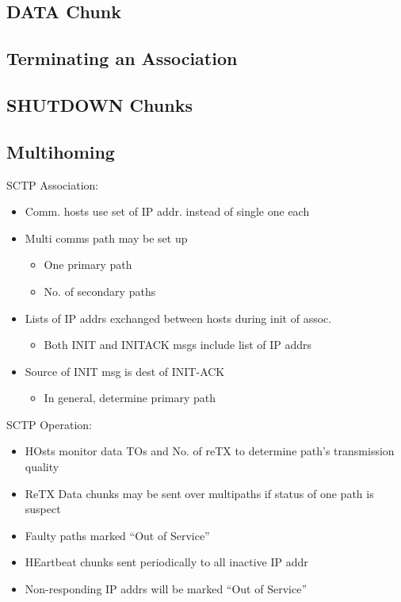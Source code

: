 \subsection{DATA Chunk}
\subsection{Terminating an Association}
\subsection{SHUTDOWN Chunks}
\subsection{Multihoming}
SCTP Association:
\begin{itemize}
	\item Comm. hosts use set of IP addr. instead of single one each
	\item Multi comms path may be set up
	\begin{itemize}
		\item One primary path
		\item No. of secondary paths
	\end{itemize}
	\item Lists of IP addrs exchanged between hosts during init of assoc.
	\begin{itemize}
		\item Both INIT and INITACK msgs include list of IP addrs
	\end{itemize}
	\item Source of INIT msg is dest of INIT-ACK
	\begin{itemize}
		\item In general, determine primary path
	\end{itemize}
\end{itemize}
SCTP Operation:
\begin{itemize}
	\item HOsts monitor data TOs and No. of reTX to determine path's
		transmission quality
	\item ReTX Data chunks may be sent over multipaths if status of one path
		is suspect
	\item Faulty paths marked ``Out of Service''
	\item HEartbeat chunks sent periodically to all inactive IP addr
	\item Non-responding IP addrs will be marked ``Out of Service''
\end{itemize}
